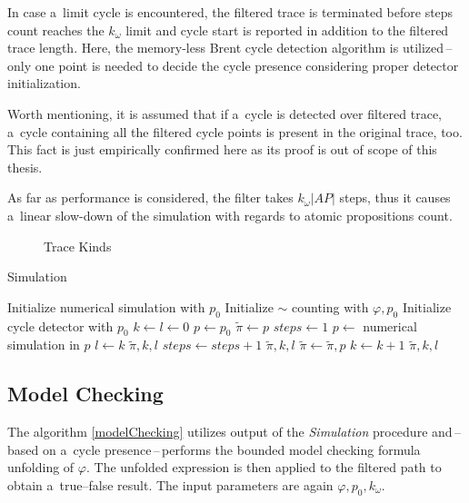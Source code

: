 \documentclass[12pt,twoside,draft]{fithesis}
\begin{document}
In case a~limit cycle is encountered, the filtered trace is terminated
before steps count reaches the $k_{\omega}$ limit and cycle start is
reported in addition to the filtered trace length. Here, the memory-less
Brent cycle detection algorithm is utilized\cite{wloop,brent}\,--\,only
one point is needed to decide the cycle presence considering proper
detector initialization.

Worth mentioning, it is assumed that if a~cycle is detected over
filtered trace, a~cycle containing all the filtered cycle points is
present in the original trace, too. This fact is just empirically
confirmed here as its proof is out of scope of this thesis.

As far as performance is considered, the filter takes $k_\omega|AP|$
steps, thus it causes a~linear slow-down of the simulation with regards
to atomic propositions count.

\begin{figure}
\label{fig:trace:kinds}
\caption{Trace Kinds}
\end{figure}


\begin{algorithm}
	\caption{Simulation}
	\label{simulationCycleDetectFilter}
	\begin{algorithmic}[1]
		\STATE Initialize numerical simulation with $p_0$
		\STATE Initialize $\sim$ counting with $\varphi, p_0$
		\STATE Initialize cycle detector with $p_0$
		\STATE $k\leftarrow l\leftarrow 0$
		\STATE $p\leftarrow p_0$
		\STATE $\tilde{\pi}\leftarrow p$
		\STATE $steps\leftarrow 1$
				\STATE $p\leftarrow$ numerical simulation in $p$
					\STATE $l\leftarrow k$ 
					\RETURN $\tilde{\pi},k,l$
				\ENDIF
				\STATE $steps\leftarrow steps+1$
			\ENDWHILE
				\RETURN $\tilde{\pi},k,l$ 
			\ENDIF
			\STATE $\tilde{\pi}\leftarrow\tilde{\pi},p$
			\STATE $k\leftarrow k+1$ 
		\ENDWHILE
		\RETURN $\tilde{\pi},k,l$
	\end{algorithmic}
\end{algorithm}

\subsection*{Model Checking}
The algorithm \ref{modelChecking} utilizes output of the
\emph{Simulation} procedure and\,--\,based on a~cycle
presence\,--\,performs the bounded model checking formula unfolding of
$\varphi$. The unfolded expression is then applied to the filtered
path to obtain a~true--false result. The input parameters are again
$\varphi,p_0,k_\omega$.
\end{document}
